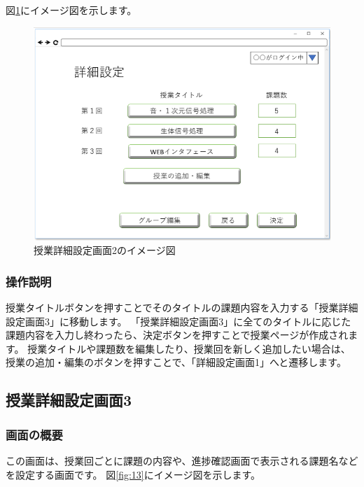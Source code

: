 図\ref{fig:12}にイメージ図を示します。

\begin{figure}[htbp]
\begin{center}
  \includegraphics[width=1\linewidth,clip]{./img/12.png}
  \caption{授業詳細設定画面2のイメージ図}\label{fig:12}
\end{center}
\end{figure}

\subsubsection{操作説明}
授業タイトルボタンを押すことでそのタイトルの課題内容を入力する「授業詳細設定画面3」に移動します。
「授業詳細設定画面3」に全てのタイトルに応じた課題内容を入力し終わったら、決定ボタンを押すことで授業ページが作成されます。
授業タイトルや課題数を編集したり、授業回を新しく追加したい場合は、 %
授業の追加・編集のボタンを押すことで、「詳細設定画面1」へと遷移します。

\newpage

\subsection{授業詳細設定画面3}
\subsubsection{画面の概要}
この画面は、授業回ごとに課題の内容や、進捗確認画面で表示される課題名などを設定する画面です。
図\ref{fig:13}にイメージ図を示します。

